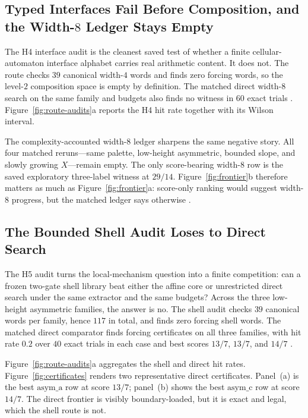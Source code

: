 \documentclass[11pt]{article}
\theoremstyle{definition}
\begin{document}
\subsection{Typed Interfaces Fail Before Composition, and the Width-\texorpdfstring{$8$}{8} Ledger Stays Empty}

The H4 interface audit is the cleanest saved test of whether a finite cellular-automaton interface alphabet carries real arithmetic content. It does not. The route checks $39$ canonical width-$4$ words and finds zero forcing words, so the level-$2$ composition space is empty by definition. The matched direct width-$8$ search on the same family and budgets also finds no witness in $60$ exact trials \citep{archivara_h4_typed_interfaces}. Figure~\ref{fig:route-audits}a reports the H4 hit rate together with its Wilson interval.

The complexity-accounted width-$8$ ledger sharpens the same negative story. All four matched reruns---same palette, low-height asymmetric, bounded slope, and slowly growing $X$---remain empty. The only score-bearing width-$8$ row is the saved exploratory three-label witness at $29/14$. Figure~\ref{fig:frontier}b therefore matters as much as Figure~\ref{fig:frontier}a: score-only ranking would suggest width-$8$ progress, but the matched ledger says otherwise \citep{archivara_complexity_frontier}.

\subsection{The Bounded Shell Audit Loses to Direct Search}

The H5 audit turns the local-mechanism question into a finite competition: can a frozen two-gate shell library beat either the affine core or unrestricted direct search under the same extractor and the same budgets? Across the three low-height asymmetric families, the answer is no. The shell audit checks $39$ canonical words per family, hence $117$ in total, and finds zero forcing shell words. The matched direct comparator finds forcing certificates on all three families, with hit rate $0.2$ over $40$ exact trials in each case and best scores $13/7$, $13/7$, and $14/7$ \citep{archivara_h5_affine_shell}.

Figure~\ref{fig:route-audits}a aggregates the shell and direct hit rates. Figure~\ref{fig:certificates} renders two representative direct certificates. Panel~(a) is the best $\mathrm{asym\_a}$ row at score $13/7$; panel~(b) shows the best $\mathrm{asym\_c}$ row at score $14/7$. The direct frontier is visibly boundary-loaded, but it is exact and legal, which the shell route is not.
\end{document}
